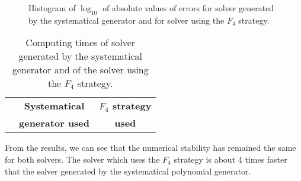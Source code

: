 \begin{figure}[ht]
  \centering
  \resizebox{0.95\textwidth}{!}{}
  \caption{Histogram of $\log_{10}$ of absolute values of errors for solver generated by the systematical generator and for solver using the $F_4$ strategy.}
  \label{graph:gen}
\end{figure}

\begin{table}[ht]
  \centering
  \begin{tabular}{|c||cc|}
    \hline
    & \textbf{Systematical}    & \textbf{$F_4$ strategy} \\
    &  \textbf{generator used} & \textbf{used} \\
    \hline\hline
    
    \hline
  \end{tabular}
  \caption{Computing times of solver generated by the systematical generator and of the solver using the $F_4$ strategy.}
  \label{tab:gen}
\end{table}

From the results, we can see that the numerical stability has remained the same for both solvers. The solver which uses the $F_4$ strategy is about 4 times faster that the solver generated by the systematical polynomial generator.
